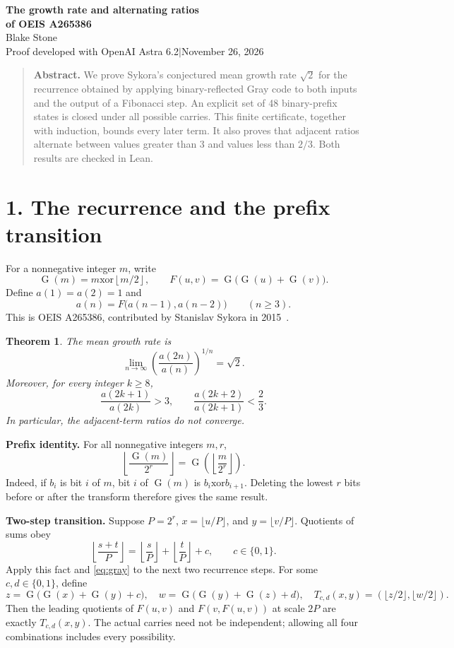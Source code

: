 \documentclass[11pt]{article}
\newtheorem{theorem}{Theorem}
\newcommand{\G}{\operatorname{G}}
\newcommand{\xor}{\mathbin{\mathrm{xor}}}
\newcommand{\floor}[1]{\left\lfloor #1\right\rfloor}
\begin{document}
\begin{center}
{\Large\bfseries The growth rate and alternating ratios\\[0.15em]of OEIS A265386}\\[0.65em]
Blake Stone\\[0.15em]
{\small Proof developed with OpenAI Astra 6.2\quad$\vert$\quad November 26, 2026}
\end{center}
\begin{quote}\small\textbf{Abstract.}
We prove Sykora's conjectured mean growth rate $\sqrt2$ for the recurrence obtained by applying binary-reflected Gray code to both inputs and the output of a Fibonacci step. An explicit set of 48 binary-prefix states is closed under all possible carries. This finite certificate, together with induction, bounds every later term. It also proves that adjacent ratios alternate between values greater than $3$ and values less than $2/3$. Both results are checked in Lean.
\end{quote}

\section*{1. The recurrence and the prefix transition}
For a nonnegative integer $m$, write
\[
 \G(m)=m\xor\floor{m/2},\qquad F(u,v)=\G\bigl(\G(u)+\G(v)\bigr).
\]
Define $a(1)=a(2)=1$ and
\[
 a(n)=F\bigl(a(n-1),a(n-2)\bigr)\qquad(n\ge3).
\]
This is OEIS A265386, contributed by Stanislav Sykora in 2015~\cite{oeis}.

\begin{theorem}\label{thm:main}
The mean growth rate is
\[
 \boxed{\displaystyle\lim_{n\to\infty}\left(\frac{a(2n)}{a(n)}\right)^{1/n}=\sqrt2.}
\]
Moreover, for every integer $k\ge8$,
\[
 \frac{a(2k+1)}{a(2k)}>3,
 \qquad
 \frac{a(2k+2)}{a(2k+1)}<\frac23.
\]
In particular, the adjacent-term ratios do not converge.
\end{theorem}

\textbf{Prefix identity.} For all nonnegative integers $m,r$,
\begin{equation}\label{eq:gray}
 \floor{\frac{\G(m)}{2^r}}=\G\left(\floor{\frac m{2^r}}\right).
\end{equation}
Indeed, if $b_i$ is bit $i$ of $m$, bit $i$ of $\G(m)$ is $b_i\xor b_{i+1}$. Deleting the lowest $r$ bits before or after the transform therefore gives the same result.

\textbf{Two-step transition.} Suppose $P=2^r$, $x=\lfloor u/P\rfloor$, and $y=\lfloor v/P\rfloor$. Quotients of sums obey
\[
 \floor{\frac{s+t}{P}}=\floor{\frac sP}+\floor{\frac tP}+c,
 \qquad c\in\{0,1\}.
\]
Apply this fact and \eqref{eq:gray} to the next two recurrence steps. For some $c,d\in\{0,1\}$, define
\begin{equation}\label{eq:transition}
 z=\G\bigl(\G(x)+\G(y)+c\bigr),\quad
 w=\G\bigl(\G(y)+\G(z)+d\bigr),\quad
 T_{c,d}(x,y)=(\lfloor z/2\rfloor,\lfloor w/2\rfloor).
\end{equation}
Then the leading quotients of $F(u,v)$ and $F(v,F(u,v))$ at scale $2P$ are exactly $T_{c,d}(x,y)$. The actual carries need not be independent; allowing all four combinations includes every possibility.
\end{document}
